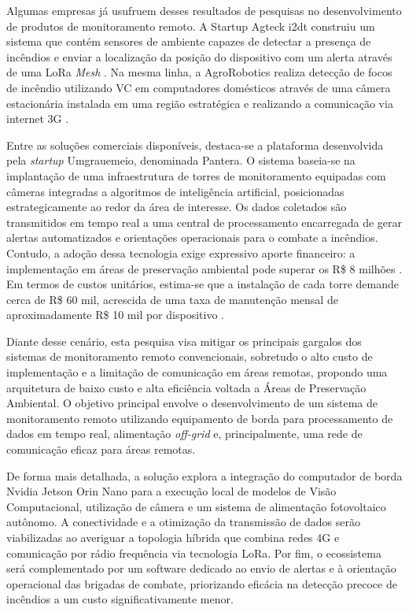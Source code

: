 Algumas empresas já usufruem desses resultados de pesquisas no desenvolvimento de produtos de monitoramento remoto. A Startup Agteck i2dt construiu um sistema que contém sensores de ambiente capazes de detectar a presença de incêndios e enviar a localização da posição do dispositivo com um alerta através de uma LoRa \textit{Mesh} \cite{cpqd2025preservacao}. Na mesma linha, a AgroRobotics realiza detecção de focos de incêndio utilizando VC em computadores domésticos através de uma câmera estacionária instalada em uma região estratégica e realizando a comunicação via internet 3G \cite{agrorobotics2022deteccao}.

Entre as soluções comerciais disponíveis, destaca-se a plataforma desenvolvida pela \textit{startup} Umgrauemeio, denominada Pantera. O sistema baseia-se na implantação de uma infraestrutura de torres de monitoramento equipadas com câmeras integradas a algoritmos de inteligência artificial, posicionadas estrategicamente ao redor da área de interesse. Os dados coletados são transmitidos em tempo real a uma central de processamento encarregada de gerar alertas automatizados e orientações operacionais para o combate a incêndios. Contudo, a adoção dessa tecnologia exige expressivo aporte financeiro: a implementação em áreas de preservação ambiental pode superar os R\$ 8 milhões \cite{umgrauemeio2023jn}. Em termos de custos unitários, estima-se que a instalação de cada torre demande cerca de R\$ 60 mil, acrescida de uma taxa de manutenção mensal de aproximadamente R\$ 10 mil por dispositivo \cite{fantin2025tecnologia}.

Diante desse cenário, esta pesquisa visa mitigar os principais gargalos dos sistemas de
monitoramento remoto convencionais, sobretudo o alto custo de implementação e a limitação de
comunicação em áreas remotas, propondo uma arquitetura de baixo custo e alta eficiência voltada a Áreas de Preservação Ambiental. O objetivo principal envolve o desenvolvimento de um sistema de monitoramento remoto utilizando equipamento de borda para processamento de dados em tempo real, alimentação \textit{off-grid} e, principalmente, uma rede de comunicação eficaz para áreas remotas.

De forma mais detalhada, a solução explora a integração do computador de borda Nvidia Jetson Orin Nano para a execução local de modelos de Visão Computacional, utilização de câmera  e um sistema de alimentação fotovoltaico autônomo. A conectividade e a otimização da transmissão de dados serão viabilizadas ao averiguar a topologia híbrida que combina redes 4G e comunicação por rádio frequência via tecnologia LoRa. Por fim, o ecossistema será complementado por um software dedicado ao envio de alertas e à orientação operacional das brigadas de combate, priorizando eficácia na detecção precoce de incêndios a um custo significativamente menor.
